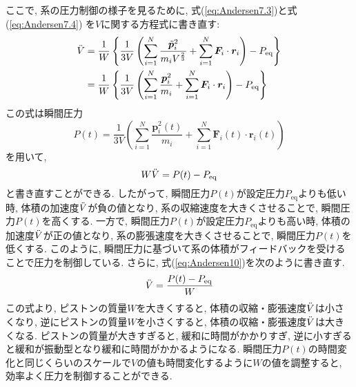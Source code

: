 ここで, 系の圧力制御の様子を見るために, 式(\ref{eq:Andersen7.3})と式(\ref{eq:Andersen7.4})
を$V$に関する方程式に書き直す: 
\begin{align}
 \Ddot{V}
 &=
 \frac{1}{W}
 \left\{
 \frac{1}{3V}
 \left(
 \sum_{i=1}^{N} \frac{\Tilde{\bm{p}}_{i}^{2}}{m_{i} V^{\frac{2}{3}}}
 + \sum_{i=1}^{N} \bm{F}_{i} \cdot \bm{r}_{i}
 \right)
 - P_{\mathrm{eq}}
 \right\}
 \notag
 \\
 &=
 \frac{1}{W}
 \left\{
 \frac{1}{3V}
 \left(
 \sum_{i=1}^{N} \frac{\bm{p}_{i}^{2}}{m_{i}}
 + \sum_{i=1}^{N} \bm{F}_{i} \cdot \bm{r}_{i}
  \right)
 - P_{\mathrm{eq}}
 \right\}
 \label{eq:Andersen8}
\end{align}
この式は瞬間圧力
\begin{equation}
 P(t)
  = \frac{1}{3V}
  \left(
   \sum_{i=1}^{N} \frac{\bm{p}_{i}^{2} (t)}{m_{i}}
  +\sum_{i=1}^{N} \bm{F}_{i}(t) \cdot \bm{r}_{i}(t)
   \right)
 \label{eq:Andersen9}
\end{equation}
を用いて, 
\begin{equation}
 W \Ddot{V} = P(t) - P_{\mathrm{eq}}
\label{eq:Andersen10}
\end{equation}
と書き直すことができる. 
したがって, 瞬間圧力$P(t)$が設定圧力$P_{\mathrm{eq}}$よりも低い時, 
体積の加速度$\Ddot{V}$が負の値となり, 系の収縮速度を大きくさせることで, 瞬間圧力$P(t)$を高くする. 
一方で, 瞬間圧力$P(t)$が設定圧力$P_{\mathrm{eq}}$よりも高い時, 
体積の加速度$\Ddot{V}$が正の値となり, 系の膨張速度を大きくさせることで, 瞬間圧力$P(t)$を低くする. 
このように, 瞬間圧力に基づいて系の体積がフィードバックを受けることで圧力を制御している. 
さらに, 式(\ref{eq:Andersen10})を次のように書き直す. 
\begin{equation}
 \Ddot{V} = \frac{P(t) - P_{\mathrm{eq}}}{W}
\label{eq:Andersen11}
\end{equation}
この式より, ピストンの質量$W$を大きくすると, 体積の収縮・膨張速度$\Ddot{V}$は小さくなり, 
逆にピストンの質量$W$を小さくすると, 体積の収縮・膨張速度$\Ddot{V}$は大きくなる. 
ピストンの質量が大きすぎると, 緩和に時間がかかりすぎ, 
逆に小すぎると緩和が振動型となり緩和に時間がかかるようになる. 
瞬間圧力$P(t)$の時間変化と同じくらいのスケールで$V$の値も時間変化するように$W$の値を調整すると, 
効率よく圧力を制御することができる. 

